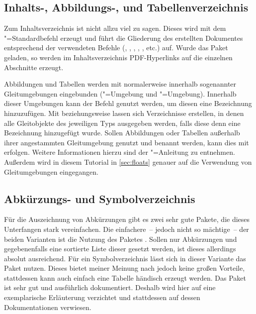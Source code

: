 \documentclass[english,ngerman]{tudscrartcl}
\begin{document}
\subsection{Inhalts-, Abbildungs-, und Tabellenverzeichnis}
Zum Inhaltsverzeichnis ist nicht allzu viel zu sagen. Dieses wird mit dem
"=Standardbefehl  erzeugt und führt die 
Gliederung des erstellten Dokumentes entsprechend der verwendeten Befehle 
(, , , , 
,  etc.) auf. Wurde das Paket  
geladen, so werden im Inhaltsverzeichnis PDF-Hyperlinks auf die einzelnen 
Abschnitte erzeugt.

Abbildungen und Tabellen werden mit  normalerweise innerhalb 
sogenannter Gleitumgebungen eingebunden ("=Umgebung und 
"=Umgebung). Innerhalb dieser Umgebungen kann der Befehl 
 genutzt 
werden, um diesen eine Bezeichnung hinzuzufügen. Mit  
beziehungsweise  lassen sich Verzeichnisse erstellen, in 
denen alle Gleitobjekte des jeweiligen Typs ausgegeben werden, falls diese denn 
eine Bezeichnung hinzugefügt wurde. Sollen Abbildungen oder Tabellen außerhalb 
ihrer angestammten Gleitumgebung genutzt und benannt werden, kann dies mit
erfolgen. Weitere Informationen hierzu sind der \KOMAScript"=Anleitung 
\scrguide zu 
entnehmen. Außerdem wird in diesem Tutorial in \autoref{sec:floats} genauer auf 
die Verwendung von Gleitumgebungen eingegangen.
%
\begin{Tutorial*}
\tableofcontents
\listoffigures
\listoftables
\end{Tutorial*}


\subsection{Abkürzungs- und Symbolverzeichnis}
\label{sec:glossaries}
Für die Auszeichnung von Abkürzungen gibt es zwei sehr gute Pakete, die dieses 
Unterfangen stark vereinfachen. Die einfachere~-- jedoch nicht so mächtige~-- 
der beiden Varianten ist die Nutzung des Paketes . Sollen nur 
Abkürzungen und gegebenenfalls eine sortierte Liste dieser gesetzt werden, ist 
dieses allerdings absolut ausreichend. Für ein Symbolverzeichnis lässt sich in 
dieser Variante das Paket  nutzen. Dieses bietet meiner 
Meinung nach jedoch keine großen Vorteile, stattdessen kann auch einfach eine 
Tabelle händisch erzeugt werden. Das Paket  ist sehr gut und 
ausführlich dokumentiert. Deshalb wird hier auf eine exemplarische Erläuterung 
verzichtet und stattdessen auf dessen Dokumentationen verwiesen.
\end{document}
